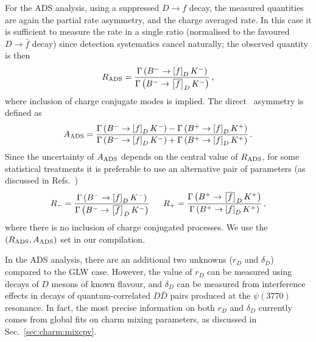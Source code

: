 For the ADS analysis, using a suppressed $D \to f$ decay,
the measured quantities are again the partial rate asymmetry, 
and the charge averaged rate.
In this case it is sufficient to measure the rate in a single ratio
(normalised to the favoured $D \to \bar{f}$ decay)
since detection systematics cancel naturally;
the observed quantity is then
\begin{equation}
  \label{eq:cp_uta:dk:r_ads}
  R_{\rm ADS} = 
  \frac{
    \Gamma \left( \Bm \to \left[ f \right]_D \Km \right)
  }{
    \Gamma \left( \Bm \to \left[ \bar{f} \right]_D \Km \right)
  } \, ,
\end{equation}
where inclusion of charge conjugate modes is implied.
The direct \CP\ asymmetry is defined as
\begin{equation}
  \label{eq:cp_uta:dk:a_ads}
  A_{\rm ADS} = 
  \frac{
    \Gamma\left(B^{-}\to\left[f\right]_DK^-\right)-
    \Gamma\left(B^{+}\to\left[f\right]_DK^+\right)
  }{
    \Gamma\left(B^{-}\to\left[f\right]_DK^-\right)+
    \Gamma\left(B^{+}\to\left[f\right]_DK^+\right)
  } \, .
\end{equation}
Since the uncertainty of $A_{\rm ADS}$ depends on the central value of $R_{\rm ADS}$, for some statistical treatments it is preferable to use an alternative pair of parameters (as discussed in Refs.~\cite{Bondar:2004bi,Rama:2010bw})
\begin{equation}
  R_- = \frac{
    \Gamma \left( \Bm \to \left[ f \right]_D \Km \right)
  }{
    \Gamma \left( \Bm \to \left[ \bar{f} \right]_D \Km \right)
  } \, 
  \hspace{5mm}
  R_+ = \frac{
    \Gamma \left( \Bp \to \left[ \bar{f} \right]_D \Kp \right)
  }{
    \Gamma \left( \Bp \to \left[ f \right]_D \Kp \right)
  } \, ,
\end{equation}
where there is no inclusion of charge conjugated processes.
We use the $(R_{\rm ADS}, A_{\rm ADS})$ set in our compilation.

In the ADS analysis, there are an additional two unknowns ($r_D$ and $\delta_D$)
compared to the GLW case.  
However, the value of $r_D$ can be measured using 
decays of $D$ mesons of known flavour, and $\delta_D$ can be measured from interference effects in decays of quantum-correlated $D\bar{D}$ pairs produced at the $\psi(3770)$ resonance.
In fact, the most precise information on both $r_D$ and $\delta_D$ currently comes from global fits on charm mixing parameters, as discussed in Sec.~\ref{sec:charm:mixcpv}.

